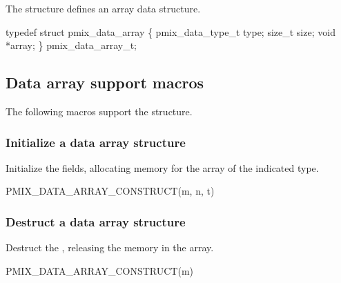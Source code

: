 The  structure defines an array data structure.

\cspecificstart
\begin{codepar}
typedef struct pmix_data_array \{
    pmix_data_type_t type;
    size_t size;
    void *array;
\} pmix_data_array_t;
\end{codepar}
\cspecificend


\subsection{Data array support macros}
The following macros support the  structure.

\subsubsection{Initialize a data array structure}

Initialize the  fields, allocating memory for the array of the indicated type.

\cspecificstart
\begin{codepar}
PMIX_DATA_ARRAY_CONSTRUCT(m, n, t)
\end{codepar}
\cspecificend

\begin{arglist}
\end{arglist}


\subsubsection{Destruct a data array structure}

Destruct the , releasing the memory in the array.

\cspecificstart
\begin{codepar}
PMIX_DATA_ARRAY_CONSTRUCT(m)
\end{codepar}
\cspecificend

\begin{arglist}
\end{arglist}


